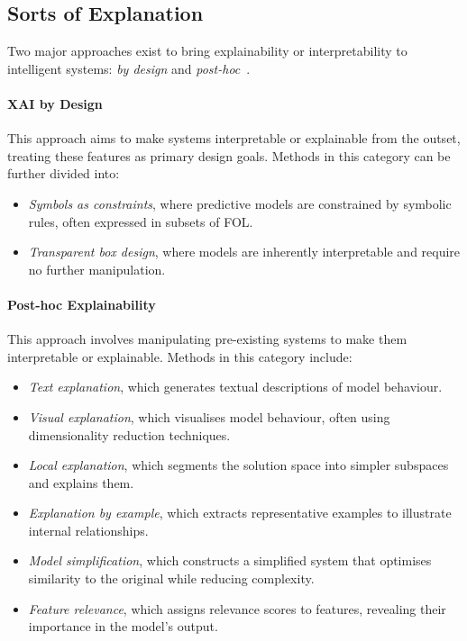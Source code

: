 \subsection{Sorts of Explanation}\label{subsec:sorts-of-explanation}
%
Two major approaches exist to bring explainability or interpretability to intelligent systems: \emph{by design} and \emph{post-hoc}~\cite{DBLP:conf/atal/CiattoSOC20,DBLP:journals/inffus/ArrietaRSBTBGGM20,DBLP:journals/csur/GuidottiMRTGP19}.


\paragraph{\Gls{XAI} by Design}
\label{par:xai-by-design}
%
This approach aims to make systems interpretable or explainable from the outset, treating these features as primary design goals.
%
Methods in this category can be further divided into:
%
\begin{itemize}
    \item \emph{Symbols as constraints}, where predictive models are constrained by symbolic rules, often expressed in subsets of \gls{FOL}.
    \item \emph{Transparent box design}, where models are inherently interpretable and require no further manipulation.
\end{itemize}

\paragraph{Post-hoc Explainability}
%
This approach involves manipulating pre-existing systems to make them interpretable or explainable.
%
Methods in this category include:
%
\begin{itemize}
    \item \emph{Text explanation}, which generates textual descriptions of model behaviour.
    \item \emph{Visual explanation}, which visualises model behaviour, often using dimensionality reduction techniques.
    \item \emph{Local explanation}, which segments the solution space into simpler subspaces and explains them.
    \item \emph{Explanation by example}, which extracts representative examples to illustrate internal relationships.
    \item \emph{Model simplification}, which constructs a simplified system that optimises similarity to the original while reducing complexity.
    \item \emph{Feature relevance}, which assigns relevance scores to features, revealing their importance in the model's output.
\end{itemize}
